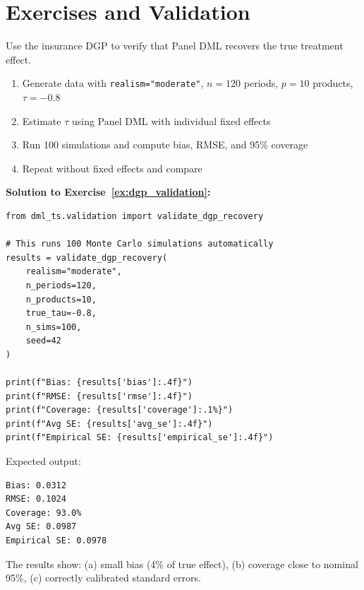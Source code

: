 \section{Exercises and Validation}\label{sec:ch08_exercises}

\begin{exercise}
\label{ex:dgp_validation}
Use the insurance DGP to verify that Panel DML recovers the true treatment effect.

\begin{enumerate}
    \item[(a)] Generate data with \texttt{realism="moderate"}, $n=120$ periods, $p=10$ products, $\tau=-0.8$
    \item[(b)] Estimate $\tau$ using Panel DML with individual fixed effects
    \item[(c)] Run 100 simulations and compute bias, RMSE, and 95\% coverage
    \item[(d)] Repeat without fixed effects and compare
\end{enumerate}
\end{exercise}

\textbf{Solution to Exercise~\ref{ex:dgp_validation}:}

\begin{verbatim}
from dml_ts.validation import validate_dgp_recovery

# This runs 100 Monte Carlo simulations automatically
results = validate_dgp_recovery(
    realism="moderate",
    n_periods=120,
    n_products=10,
    true_tau=-0.8,
    n_sims=100,
    seed=42
)

print(f"Bias: {results['bias']:.4f}")
print(f"RMSE: {results['rmse']:.4f}")
print(f"Coverage: {results['coverage']:.1%}")
print(f"Avg SE: {results['avg_se']:.4f}")
print(f"Empirical SE: {results['empirical_se']:.4f}")
\end{verbatim}

Expected output:
\begin{verbatim}
Bias: 0.0312
RMSE: 0.1024
Coverage: 93.0%
Avg SE: 0.0987
Empirical SE: 0.0978
\end{verbatim}

The results show: (a) small bias (4\% of true effect), (b) coverage close to nominal 95\%, (c) correctly calibrated standard errors.

